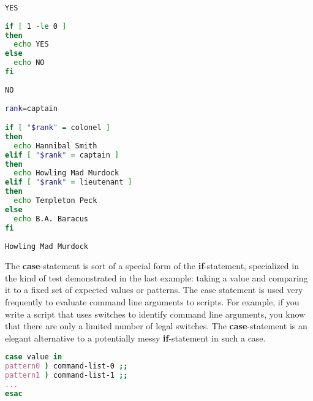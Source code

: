 \scriptsize
\begin{verbatim}
YES
\end{verbatim}
\normalsize

\lstset{basicstyle=\scriptsize, numbers=left, captionpos=b, tabsize=4}
\begin{lstlisting}[caption=Example of an if statement with an else clause,language={bash},
breaklines=true,xleftmargin=15pt,label=lst:Example of an if statement with an else clause]
if [ 1 -le 0 ]
then
  echo YES
else
  echo NO
fi
\end{lstlisting}

\scriptsize
\begin{verbatim}
NO
\end{verbatim}
\normalsize

\lstset{basicstyle=\scriptsize, numbers=left, captionpos=b, tabsize=4}
\begin{lstlisting}[caption=Example of a full if statement with an else clause and two elifs,language={bash},
breaklines=true,xleftmargin=15pt,label=lst:Example of a full if statement with an else clause and two elifs]
rank=captain

if [ "$rank" = colonel ]
then
  echo Hannibal Smith
elif [ "$rank" = captain ]
then
  echo Howling Mad Murdock
elif [ "$rank" = lieutenant ]
then
  echo Templeton Peck
else
  echo B.A. Baracus
fi
\end{lstlisting}

\scriptsize
\begin{verbatim}
Howling Mad Murdock
\end{verbatim}
\normalsize

The \textbf{case}-statement is sort of a special form of the
\textbf{if}-statement, specialized in the kind of test demonstrated in the last
example: taking a value and comparing it to a fixed set of expected values or
patterns. The case statement is used very frequently to evaluate command line
arguments to scripts. For example, if you write a script that uses switches to
identify command line arguments, you know that there are only a limited number
of legal switches. The \textbf{case}-statement is an elegant alternative to a
potentially messy \textbf{if}-statement in such a case.
\lstset{basicstyle=\scriptsize, numbers=left, captionpos=b, tabsize=4}
\begin{lstlisting}[caption=The general form of the case statement is,language={bash},
breaklines=true,xleftmargin=15pt,label=lst:The general form of the case statement is]
case value in
pattern0 ) command-list-0 ;;
pattern1 ) command-list-1 ;;
...
esac
\end{lstlisting}

